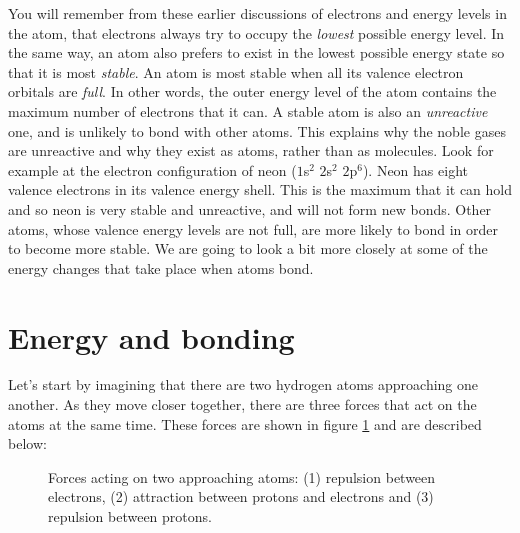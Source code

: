 You will remember from these earlier discussions of electrons and energy levels in the atom, that electrons always try to occupy the \textit{lowest} possible energy level. In the same way, an atom also prefers to exist in the lowest possible energy state so that it is most \textit{stable}. An atom is most stable when all its valence electron orbitals are \textit{full}. In other words, the outer energy level of the atom contains the maximum number of electrons that it can. A stable atom is also an \textit{unreactive} one, and is unlikely to bond with other atoms. This explains why the noble gases are unreactive and why they exist as atoms, rather than as molecules. Look for example at the electron configuration of neon ($1$s$^{2}$ $2$s$^{2}$ $2$p$^{6}$). Neon has eight valence electrons in its valence energy shell. This is the maximum that it can hold and so neon is very stable and unreactive, and will not form new bonds. Other atoms, whose valence energy levels are not full, are more likely to bond in order to become more stable. We are going to look a bit more closely at some of the energy changes that take place when atoms bond.






\section{Energy and bonding}

Let's start by imagining that there are two hydrogen atoms approaching one another. As they move closer together, there are three forces that act on the atoms at the same time. These forces are shown in figure \ref{fig:bondingforces} and are described below:

\begin{figure}[H]
\begin{center}
\end{center}
\caption{Forces acting on two approaching atoms: (1) repulsion between electrons, (2) attraction between protons and electrons and (3) repulsion between protons.}
\label{fig:bondingforces}
\end{figure}

